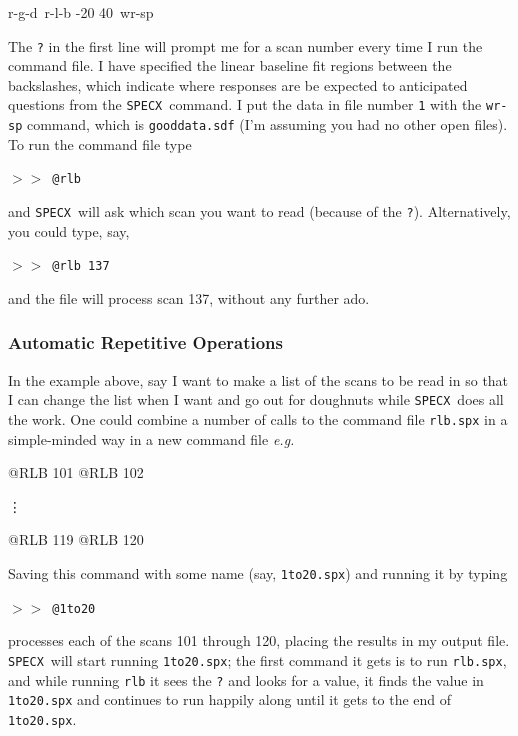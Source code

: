 \documentclass[11pt,twoside]{starlink}
\providecommand{\eg}{\textit{e.g.}}
\providecommand{\SPECX}{\texttt{SPECX}}
\providecommand{\SP}{{$>\!>$}}
\begin{document}
\begin{terminalv}
r-g-d\?\
r-l-b -20 40\
wr-sp\1\
\end{terminalv}

The \texttt{?} in the first line will prompt me for a scan number every
time I run the command file. I have specified the linear baseline fit
regions between the backslashes, which indicate where responses are be
expected to
anticipated questions from the
\SPECX\ command. I put the data in file number \texttt{1} with the \texttt{wr-sp}
command, which is \texttt{gooddata.sdf} (I'm assuming you had no other open
files). To run the command file type

\SP\ \verb|@rlb|

and \SPECX\ will ask which scan you want to read (because of the \texttt{?}).
Alternatively, you could type, say,

\SP\ \verb|@rlb 137|

and the file will process scan 137, without any further ado.

\subsubsection{Automatic Repetitive Operations}
\label{sec:specx_9.3}
In the example above, say I want to make a list of the scans to be
read in so that I can change the list when I want and go out for
doughnuts while \SPECX\ does all the work.  One could combine a number
of calls to the command file \texttt{rlb.spx} in a simple-minded way in a
new command file \eg\

\begin{terminalv}
@RLB 101
@RLB 102
\end{terminalv}
\vspace*{-0.1in}
\vdots
\vspace*{-0.1in}
\begin{terminalv}
@RLB 119
@RLB 120
\end{terminalv}

Saving this command with some name (say, \texttt{1to20.spx}) and running it
by typing

\SP\ \texttt{@1to20}

processes each of the scans 101 through 120, placing the results in my
output file. \SPECX\ will start running \texttt{1to20.spx}; the first command
it gets is to run \texttt{rlb.spx}, and while running \texttt{rlb} it sees
the \texttt{?} and looks for a value, it finds the value in \texttt{1to20.spx} and continues to run happily along until it gets to the end
of \texttt{1to20.spx}.
\end{document}
